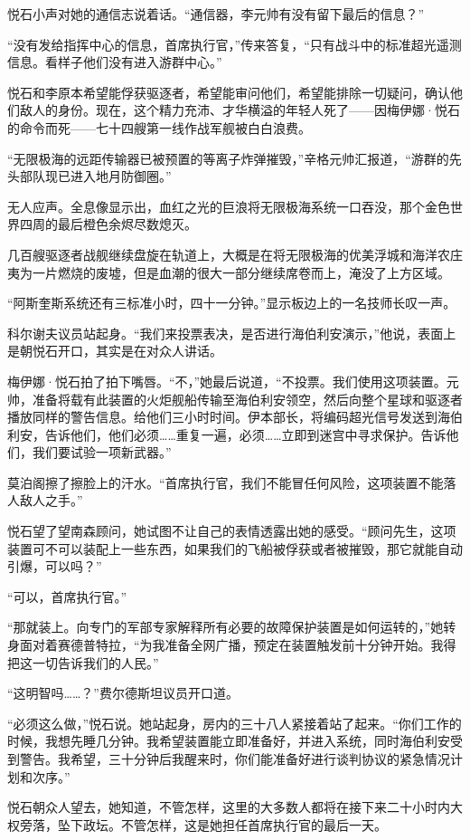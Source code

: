 \documentclass[AutoFakeBold=true]{book}
\begin{document}
悦石小声对她的通信志说着话。``通信器，李元帅有没有留下最后的信息？''

``没有发给指挥中心的信息，首席执行官，''传来答复，``只有战斗中的标准超光遥测信息。看样子他们没有进入游群中心。''

悦石和李原本希望能俘获驱逐者，希望能审问他们，希望能排除一切疑问，确认他们敌人的身份。现在，这个精力充沛、才华横溢的年轻人死了——因梅伊娜·悦石的命令而死——七十四艘第一线作战军舰被白白浪费。

``无限极海的远距传输器已被预置的等离子炸弹摧毁，''辛格元帅汇报道，``游群的先头部队现已进入地月防御圈。''

无人应声。全息像显示出，血红之光的巨浪将无限极海系统一口吞没，那个金色世界四周的最后橙色余烬尽数熄灭。

几百艘驱逐者战舰继续盘旋在轨道上，大概是在将无限极海的优美浮城和海洋农庄夷为一片燃烧的废墟，但是血潮的很大一部分继续席卷而上，淹没了上方区域。

``阿斯奎斯系统还有三标准小时，四十一分钟。''显示板边上的一名技师长叹一声。

科尔谢夫议员站起身。``我们来投票表决，是否进行海伯利安演示，''他说，表面上是朝悦石开口，其实是在对众人讲话。

梅伊娜·悦石拍了拍下嘴唇。``不，''她最后说道，``不投票。我们使用这项装置。元帅，准备将载有此装置的火炬舰船传输至海伯利安领空，然后向整个星球和驱逐者播放同样的警告信息。给他们三小时时间。伊本部长，将编码超光信号发送到海伯利安，告诉他们，他们必须……重复一遍，必须……立即到迷宫中寻求保护。告诉他们，我们要试验一项新武器。''

莫泊阁擦了擦脸上的汗水。``首席执行官，我们不能冒任何风险，这项装置不能落人敌人之手。''

悦石望了望南森顾问，她试图不让自己的表情透露出她的感受。``顾问先生，这项装置可不可以装配上一些东西，如果我们的飞船被俘获或者被摧毁，那它就能自动引爆，可以吗？''

``可以，首席执行官。''

``那就装上。向专门的军部专家解释所有必要的故障保护装置是如何运转的，''她转身面对着赛德普特拉，``为我准备全网广播，预定在装置触发前十分钟开始。我得把这一切告诉我们的人民。''

``这明智吗……？''费尔德斯坦议员开口道。

``必须这么做，''悦石说。她站起身，房内的三十八人紧接着站了起来。``你们工作的时候，我想先睡几分钟。我希望装置能立即准备好，并进入系统，同时海伯利安受到警告。我希望，三十分钟后我醒来时，你们能准备好进行谈判协议的紧急情况计划和次序。''

悦石朝众人望去，她知道，不管怎样，这里的大多数人都将在接下来二十小时内大权旁落，坠下政坛。不管怎样，这是她担任首席执行官的最后一天。
\end{document}
